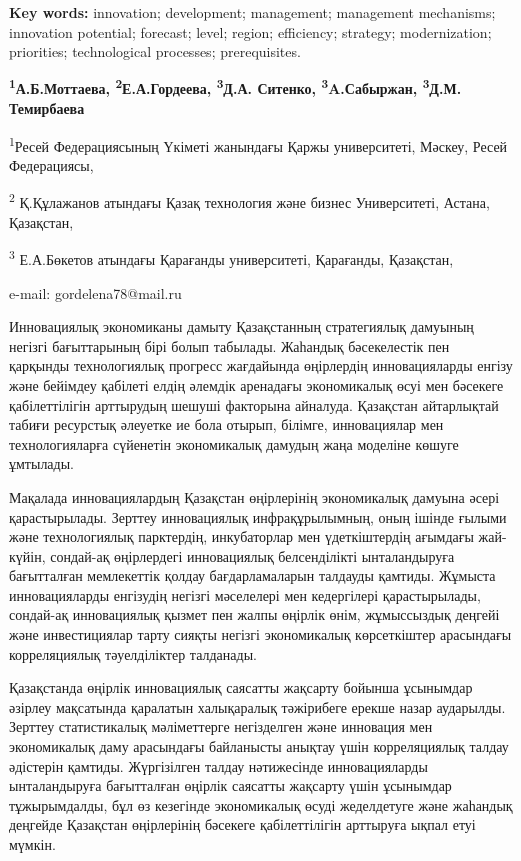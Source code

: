 {\bfseries Key words:} innovation; development; management; management
mechanisms; innovation potential; forecast; level; region; efficiency;
strategy; modernization; priorities; technological processes;
prerequisites.


\begin{center}
{\bfseries \textsuperscript{1}А.Б.Моттаева,
\textsuperscript{2}Е.А.Гордеева\envelope,
\textsuperscript{3}Д.А. Ситенко, \textsuperscript{3}A.Сабыржан,
\textsuperscript{3}Д.М.} {\bfseries Темирбаева}

\textsuperscript{1}Ресей Федерациясының Үкіметі жанындағы Қаржы
университеті, Мәскеу, Ресей Федерациясы,

\textsuperscript{2} Қ.Құлажанов атындағы Қазақ технология және бизнес
Университеті, Астана, Қазақстан,

\textsuperscript{3} Е.А.Бөкетов атындағы Қарағанды университеті,
Қарағанды, Қазақстан,

e-mail: gordelena78@mail.ru
\end{center}

Инновациялық экономиканы дамыту Қазақстанның стратегиялық дамуының
негізгі бағыттарының бірі болып табылады. Жаһандық бәсекелестік пен
қарқынды технологиялық прогресс жағдайында өңірлердің инновацияларды
енгізу және бейімдеу қабілеті елдің әлемдік аренадағы экономикалық өсуі
мен бәсекеге қабілеттілігін арттырудың шешуші факторына айналуда.
Қазақстан айтарлықтай табиғи ресурстық әлеуетке ие бола отырып, білімге,
инновациялар мен технологияларға сүйенетін экономикалық дамудың жаңа
моделіне көшуге ұмтылады.

Мақалада инновациялардың Қазақстан өңірлерінің экономикалық дамуына
әсері қарастырылады. Зерттеу инновациялық инфрақұрылымның, оның ішінде
ғылыми және технологиялық парктердің, инкубаторлар мен үдеткіштердің
ағымдағы жай-күйін, сондай-ақ өңірлердегі инновациялық белсенділікті
ынталандыруға бағытталған мемлекеттік қолдау бағдарламаларын талдауды
қамтиды. Жұмыста инновацияларды енгізудің негізгі мәселелері мен
кедергілері қарастырылады, сондай-ақ инновациялық қызмет пен жалпы
өңірлік өнім, жұмыссыздық деңгейі және инвестициялар тарту сияқты
негізгі экономикалық көрсеткіштер арасындағы корреляциялық тәуелділіктер
талданады.

Қазақстанда өңірлік инновациялық саясатты жақсарту бойынша ұсынымдар
әзірлеу мақсатында қаралатын халықаралық тәжірибеге ерекше назар
аударылды. Зерттеу статистикалық мәліметтерге негізделген және инновация
мен экономикалық даму арасындағы байланысты анықтау үшін корреляциялық
талдау әдістерін қамтиды. Жүргізілген талдау нәтижесінде инновацияларды
ынталандыруға бағытталған өңірлік саясатты жақсарту үшін ұсынымдар
тұжырымдалды, бұл өз кезегінде экономикалық өсуді жеделдетуге және
жаһандық деңгейде Қазақстан өңірлерінің бәсекеге қабілеттілігін
арттыруға ықпал етуі мүмкін.


